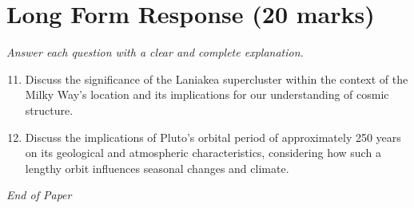 \documentclass[12pt]{article}
\begin{document}
\section*{Long Form Response (20 marks)}
\textit{Answer each question with a clear and complete explanation.}
\begin{enumerate}[label=\arabic*.]
\setcounter{enumi}{10}
\item Discuss the significance of the Laniakea supercluster within the context of the Milky
Way's location and its implications for our understanding of cosmic structure.
\item Discuss the implications of Pluto's orbital period of approximately 250 years on its
geological and atmospheric characteristics, considering how such a lengthy orbit
influences seasonal changes and climate.
\end{enumerate}

\vfill
\noindent\textit{End of Paper}
\end{document}
